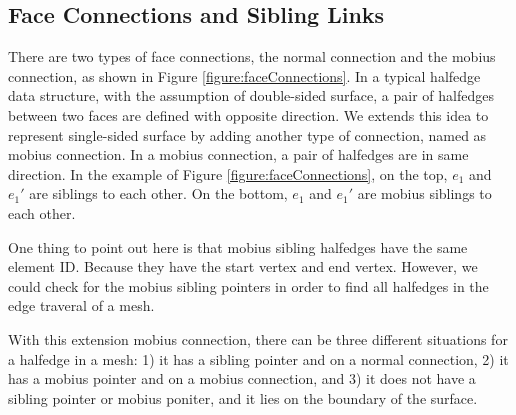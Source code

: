\documentclass[12pt]{article}
\begin{document}
\subsection{Face Connections and Sibling Links}

There are two types of face connections, the normal connection and the mobius connection, as shown in Figure \ref{figure:faceConnections}. In a typical halfedge data structure, with the assumption of double-sided surface, a pair of halfedges between two faces are defined with opposite direction. We extends this idea to represent single-sided surface by adding another type of connection, named as mobius connection. In a mobius connection, a pair of halfedges are in same direction. In the example of Figure \ref{figure:faceConnections}, on the top, $e_1$ and $e_1'$ are siblings to each other. On the bottom, $e_1$ and $e_1'$ are mobius siblings to each other. 

One thing to point out here is that mobius sibling halfedges have the same element ID. Because they have the start vertex and end vertex. However, we could check for the mobius sibling pointers in order to find all halfedges in the edge traveral of a mesh.

With this extension mobius connection, there can be three different situations for a halfedge in a mesh: 1) it has a sibling pointer and on a normal connection, 2) it has a mobius pointer and on a mobius connection, and 3) it does not have a sibling pointer or mobius poniter, and it lies on the boundary of the surface.
\end{document}
